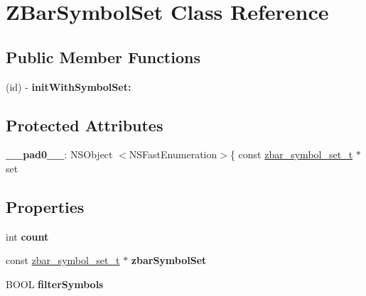 \hypertarget{interface_z_bar_symbol_set}{
\section{ZBarSymbolSet Class Reference}
\label{interface_z_bar_symbol_set}
}
\subsection*{Public Member Functions}
\begin{DoxyCompactItemize}
\item 
\hypertarget{interface_z_bar_symbol_set_a0d71b063884c2484ee571c22c4199d6b}{
(id) -\/ {\bfseries initWithSymbolSet:}}
\label{interface_z_bar_symbol_set_a0d71b063884c2484ee571c22c4199d6b}

\end{DoxyCompactItemize}
\subsection*{Protected Attributes}
\begin{DoxyCompactItemize}
\item 
\hypertarget{interface_z_bar_symbol_set_ae410a8e9234885fd10e50340c49c4152}{
{\bfseries \_\-\_\-pad0\_\-\_\-}: NSObject $<$NSFastEnumeration$>$\{ const \hyperlink{zbar_8h_a80376ce7ea64e9a96e9d73b6e9f600d0}{zbar\_\-symbol\_\-set\_\-t} $\ast$set}
\label{interface_z_bar_symbol_set_ae410a8e9234885fd10e50340c49c4152}

\end{DoxyCompactItemize}
\subsection*{Properties}
\begin{DoxyCompactItemize}
\item 
\hypertarget{interface_z_bar_symbol_set_a25d910fe6721fd53b057edb90ae752b3}{
int {\bfseries count}}
\label{interface_z_bar_symbol_set_a25d910fe6721fd53b057edb90ae752b3}

\item 
\hypertarget{interface_z_bar_symbol_set_a209c85a403dfb2604dcc6297e446cc06}{
const \hyperlink{zbar_8h_a80376ce7ea64e9a96e9d73b6e9f600d0}{zbar\_\-symbol\_\-set\_\-t} $\ast$ {\bfseries zbarSymbolSet}}
\label{interface_z_bar_symbol_set_a209c85a403dfb2604dcc6297e446cc06}

\item 
\hypertarget{interface_z_bar_symbol_set_a5a4739d78beffb10cdfd172abf49e91c}{
BOOL {\bfseries filterSymbols}}
\label{interface_z_bar_symbol_set_a5a4739d78beffb10cdfd172abf49e91c}

\end{DoxyCompactItemize}


